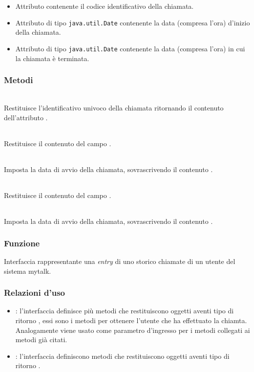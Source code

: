 \begin{itemize}
	\item{}
	Attributo contenente il codice identificativo della chiamata.
	\item{}
	Attributo di tipo \texttt{java.util.Date} contenente la data (compresa l'ora) d'inizio della chiamata.
	\item{}
	Attributo di tipo \texttt{java.util.Date} contenente la data (compresa l'ora) in cui la chiamata è terminata.
\end{itemize}

\subsubsection*{Metodi}
\begin{description}
	\item{}\\
	Restituisce l'identificativo univoco della chiamata ritornando il contenuto dell'attributo .
	\item{}\\
	Restituisce il contenuto del campo .
	\item{}\\
	Imposta la data di avvio della chiamata, sovrascrivendo il contenuto .
	\item{}\\
	Restituisce il contenuto del campo .
	\item{}\\
	Imposta la data di avvio della chiamata, sovrascrivendo il contenuto .
\end{description}


\subsubsection*{Funzione}
Interfaccia rappresentante una \textit{entry} di uno storico chiamate di un utente del sistema mytalk.

\subsubsection*{Relazioni d'uso}
\begin{itemize}
	\item {}: l'interfaccia  definisce più metodi che restituiscono oggetti aventi tipo di ritorno , essi sono i metodi  per ottenere l'utente che ha effettuato la chiamta. Analogamente  viene usato come parametro d'ingresso per i metodi  collegati ai metodi già citati.
	\item {}: l'interfaccia  definiscono metodi che restituiscono oggetti aventi tipo di ritorno .
\end{itemize}

